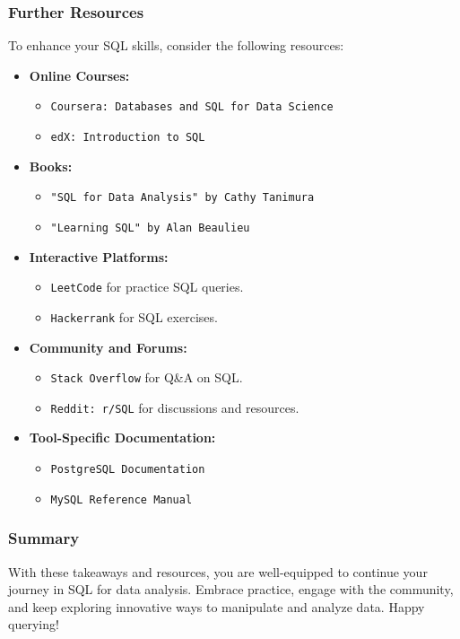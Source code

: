 \documentclass{beamer}
\begin{document}
\begin{frame}[fragile]
    \frametitle{Further Resources}
    To enhance your SQL skills, consider the following resources:
    \begin{itemize}
        \item \textbf{Online Courses:}
        \begin{itemize}
            \item \texttt{Coursera: Databases and SQL for Data Science}
            \item \texttt{edX: Introduction to SQL}
        \end{itemize}
        
        \item \textbf{Books:}
        \begin{itemize}
            \item \texttt{"SQL for Data Analysis" by Cathy Tanimura}
            \item \texttt{"Learning SQL" by Alan Beaulieu}
        \end{itemize}
        
        \item \textbf{Interactive Platforms:}
        \begin{itemize}
            \item \texttt{LeetCode} for practice SQL queries.
            \item \texttt{Hackerrank} for SQL exercises.
        \end{itemize}
        
        \item \textbf{Community and Forums:}
        \begin{itemize}
            \item \texttt{Stack Overflow} for Q\&A on SQL.
            \item \texttt{Reddit: r/SQL} for discussions and resources.
        \end{itemize}
        
        \item \textbf{Tool-Specific Documentation:}
        \begin{itemize}
            \item \texttt{PostgreSQL Documentation}
            \item \texttt{MySQL Reference Manual}
        \end{itemize}
    \end{itemize}
\end{frame}

\begin{frame}[fragile]
    \frametitle{Summary}
    With these takeaways and resources, you are well-equipped to continue your journey in SQL for data analysis. Embrace practice, engage with the community, and keep exploring innovative ways to manipulate and analyze data. Happy querying!
\end{frame}
\end{document}
